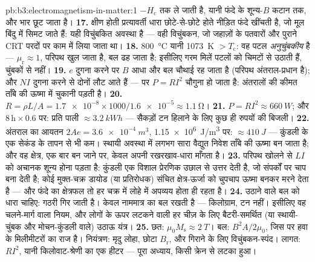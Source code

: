 \begin{solution}{pb:b3:electromagnetism-in-matter:1}
$-H_{\text{c}}$ तक ले जाती है, यानी फंदे के शून्य-$B$ कटान तक, और
भार छूट जाता है।
\textbf{17.} क्षीण होती प्रत्यावर्ती धारा छोटे-से-छोटे होते नीड़ित
फंदे खींचती है, जो मूल बिंदु में सिमट जाते हैं: यही विचुंबकित
अवस्था है --- वही विचुंबकन, जो जहाज़ों के पतवारों और पुराने
CRT परदों पर काम में लिया जाता था।
\textbf{18.} \qty{800}{\celsius} यानी \qty{1073}{K} $> T_{\text{c}}$:
वह पटल \emph{अनुचुंबकीय} है --- $\mu_{\text{r}} \approx 1$,
परिपथ खुल जाता है, बल ढह जाता है; इसीलिए गरम मिलें पटलों को चिमटों
से उठाती हैं, चुंबकों से नहीं।
\textbf{19.} $e$ दुगना करने पर $B$ आधा और बल चौथाई रह जाता है
(परिपथ अंतराल-प्रधान है); और $NI$ दुगना करने से दोनों लौट आते हैं ---
पर $P = RI^2$ चौगुना हो जाता है: अंतरालों की कीमत ताँबे की ऊष्मा में
चुकानी पड़ती है।
\textbf{20.} $R = \rho L/A = \num{1.7e-8}\times1000/
\num{1.6e-5} \approx \qty{1.1}{\ohm}$।
\textbf{21.} $P = RI^2 \approx \qty{660}{W}$; और
$8\,\text{h}\times0.6$ पर: प्रति पाली $\approx\qty{3.2}{kWh}$ ---
सैकड़ों टन हिलाने के लिए कुछ ही रुपयों की बिजली।
\textbf{22.} अंतराल का आयतन $2Ae = \qty{3.6e-4}{m^3}$,
\qty{1.15e6}{J/m^3} पर: $\approx\qty{410}{J}$ --- कुंडली के एक
सेकंड के तापन से भी कम। स्थायी अवस्था में लगभग सारा वैद्युत
निवेश ताँबे की ऊष्मा बन जाता है; और वह क्षेत्र, एक बार बन जाने पर,
केवल अपनी रखरखाव-धारा माँगता है।
\textbf{23.} परिपथ खोलने से $LI$ को अचानक शून्य होना पड़ता है:
कुंडली एक विशाल प्रेरणिक उछाल से उत्तर देती है, जो संपर्कों पर चाप
बना देती है; कोई मुक्त-चक्र डायोड (या प्रतिरोधक) संचित क्षेत्र-ऊर्जा
को चुपचाप ऊष्मा बनकर मरने देता है --- और फंदे का क्षेत्रफल तो हर चक्र
में लोहे में अपव्यय होता ही रहता है।
\textbf{24.} उठाने वाले बल को धारा चाहिए: गठरी गिर जाती है।
 केवल नाममात्र का बल रखती है --- किलोग्राम, टन नहीं।
इसीलिए वह चलने-मार्ग वाला नियम, और लोगों के ऊपर लटकने वाली हर चीज़
के लिए बैटरी-समर्थित (या स्थायी-चुंबक और मोचन-कुंडली वाले) उठाऊ यंत्र।
\textbf{25.} छत: $\mu_0M_{\text{s}} \approx \qty{2}{T}$।
बल: $B^2A/2\mu_0$, जिस पर हवा के मिलीमीटरों का राज है। नियंत्रण:
मृदु लोहा, छोटा $B_{\text{r}}$, और गिराने के लिए विचुंबकन-स्पंद।
लागत: $RI^2$, यानी किलोवाट-श्रेणी का एक हीटर --- पूरा अध्याय, किसी
क्रेन से लटका हुआ।
\end{solution}
